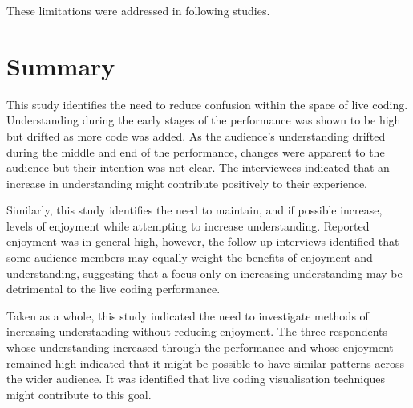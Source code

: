 These limitations were addressed in following studies.

\section{Summary}

This study identifies the need to reduce confusion within the space of live coding. Understanding during the early stages of the performance was shown to be high but drifted as more code was added. As the audience's understanding drifted during the middle and end of the performance, changes were apparent to the audience but their intention was not clear. The interviewees indicated that an increase in understanding might contribute positively to their experience.

Similarly, this study identifies the need to maintain, and if possible increase, levels of enjoyment while attempting to increase understanding. Reported enjoyment was in general high, however, the follow-up interviews identified that some audience members may equally weight the benefits of enjoyment and understanding, suggesting that a focus only on increasing understanding may be detrimental to the live coding performance.

Taken as a whole, this study indicated the need to investigate methods of increasing understanding without reducing enjoyment. The three respondents whose understanding increased through the performance and whose enjoyment remained high indicated that it might be possible to have similar patterns across the wider audience. It was identified that live coding visualisation techniques might contribute to this goal.

